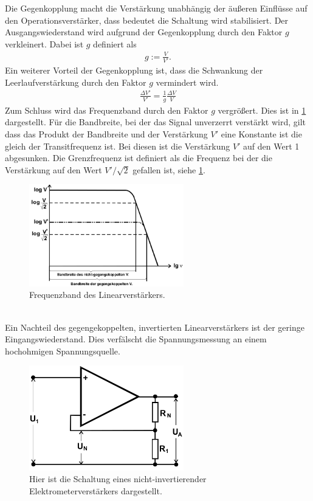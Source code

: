 Die Gegenkopplung macht die Verstärkung unabhängig der äußeren Einflüsse auf den Operationsverstärker, dass bedeutet die Schaltung wird stabilisiert.
Der Ausgangswiederstand wird aufgrund der Gegenkopplung durch den Faktor $g$ verkleinert.
Dabei ist $g$ definiert als
\begin{align}
	g:= \frac{V}{V'}.
\end{align}
Ein weiterer Vorteil der Gegenkopplung ist, dass die Schwankung der Leerlaufverstärkung durch den Faktor $g$ vermindert wird.
\begin{align}
	\frac{\Delta V'}{V'}=\frac{1}{g}\frac{\Delta V}{V}
\end{align}
Zum Schluss wird das Frequenzband durch den Faktor $g$ vergrößert.
Dies ist in \cref{fig:Frequenzgang} dargestellt. 
Für die Bandbreite, bei der das Signal unverzerrt verstärkt wird, gilt dass das Produkt der Bandbreite und der Verstärkung $V'$ eine Konstante ist die gleich der Transitfrequenz ist.
Bei diesen ist die Verstärkung $V'$ auf den Wert 1 abgesunken.
Die Grenzfrequenz ist definiert als die Frequenz bei der die Verstärkung auf den Wert $ V'/ \sqrt{2} $ gefallen ist, siehe \cref{fig:Frequenzgang}.
\begin{figure}[h!]
	\centering
	\includegraphics[width = 0.6\textwidth]{../Grafiken/Frequenz_Liniearverstaerker.png}
	\caption{Frequenzband des Linearverstärkers. \cite{V51}\label{fig:Frequenzgang}}
\end{figure}\\
Ein Nachteil des gegengekoppelten, invertierten Linearverstärkers ist der geringe Eingangswiederstand.
Dies verfälscht die Spannungsmessung an einem hochohmigen Spannungsquelle.
\begin{figure}[h!]
	\centering
	\includegraphics[width = 0.6\textwidth]{../Grafiken/nicht_invertierter_Linearverstaerker.png}
	\caption{Hier ist die Schaltung eines nicht-invertierender Elektrometerverstärkers dargestellt. \cite{V51}\label{fig:Elektrometerverstärker}}
\end{figure}
